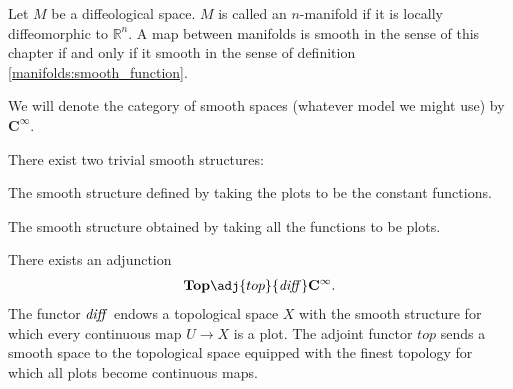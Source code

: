 
    \begin{adefinition}[Manifold]
        Let $M$ be a diffeological space. $M$ is called an $n$-manifold if it is locally diffeomorphic to $\mathbb{R}^n$. A map between manifolds is smooth in the sense of this chapter if and only if it smooth in the sense of definition \ref{manifolds:smooth_function}.
    \end{adefinition}

    \begin{notation}
        We will denote the category of smooth spaces (whatever model we might use) by $\mathbf{C^\infty}$.
    \end{notation}

    There exist two trivial smooth structures:
    \begin{example}
        The smooth structure defined by taking the plots to be the constant functions.
    \end{example}
    \begin{example}
        The smooth structure obtained by taking all the functions to be plots.
    \end{example}

    \begin{property}
        There exists an adjunction
        \begin{gather}
            \mathbf{Top}\adj{top}{\text{\textit{diff}}}\mathbf{C^\infty}.
        \end{gather}
        The functor $\text{\textit{diff}}$ endows a topological space $X$ with the smooth structure for which every continuous map $U\rightarrow X$ is a plot. The adjoint functor $top$ sends a smooth space to the topological space equipped with the finest topology for which all plots become continuous maps.
    \end{property}


